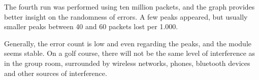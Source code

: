 The fourth run was performed using ten million packets, and the graph provides better insight on the randomness of errors. A few peaks appeared, but usually smaller peaks between 40 and 60 packets lost per 1.000.

Generally, the error count is low and even regarding the peaks, and the module seems stable. On a golf course, there will not be the same level of interference as in the group room, surrounded by wireless networks, phones, bluetooth devices and other sources of interference.

